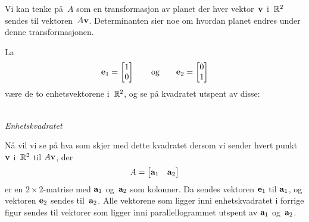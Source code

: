 Vi kan tenke på~$A$ som en transformasjon av planet der hver
vektor~$\mathbf{v}$ i~$\mathbb{R}^2$ sendes til vektoren~$A \mathbf{v}$.  Determinanten
sier noe om hvordan planet endres under denne transformasjonen.

La
\[
\mathbf{e}_1 = \begin{bmatrix} 1 \\ 0 \end{bmatrix}
\qquad\text{og}\qquad
\mathbf{e}_2 = \begin{bmatrix} 0 \\ 1 \end{bmatrix}
\]
være de to enhetsvektorene i~$\mathbb{R}^2$, og se på kvadratet utspent av
disse:
\begin{center}
\\
{\small \textit{Enhetskvadratet}}
\end{center}
Nå vil vi se på hva som skjer med dette kvadratet dersom vi sender
hvert punkt $\mathbf{v}$ i~$\mathbb{R}^2$ til $A \mathbf{v}$, der
\[
A = \begin{bmatrix} \mathbf{a}_1 & \mathbf{a}_2 \end{bmatrix}
\]
er en $2 \times 2$-matrise med $\mathbf{a}_1$ og~$\mathbf{a}_2$ som kolonner.
Da sendes vektoren $\mathbf{e}_1$ til $\mathbf{a}_1$, og vektoren $\mathbf{e}_2$
sendes til~$\mathbf{a}_2$.  Alle vektorene som ligger inni enhetskvadratet
i forrige figur sendes til vektorer som ligger inni parallellogrammet
utspent av $\mathbf{a}_1$ og~$\mathbf{a}_2$.

